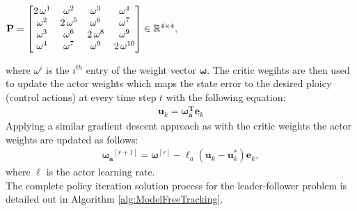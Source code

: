 \documentclass[conference]{IEEEtran}
\begin{document}
 \begin{center}
 ${\bf P}=\begin{bmatrix} 
 2\,\omega^{1}    & \omega^{2}      & \omega^{3}       & \omega^{4}        \\ 
 \omega^{2}       &2\, \omega^{5}   & \omega^{6}       & \omega^{7}        \\
 \omega^{3}       & \omega^{6}      &2\, \omega^{8}   & \omega^{9}   \\   
 \omega^{4}       & \omega^{7}      & \omega^{9}      & 2\,\omega^{10}      
 \end{bmatrix}\in \mathbb{R}^{4\times 4},$
 \end{center}
 where $\omega^{i}$ is the $i^{th}$ entry of the weight vector $\bm{\omega}.$ 
 The critic wegihts are then used to update the actor weights which maps the state error to the desired ploicy (control actions) at every time step $t$ with the following equation:
 \begin{align}
 \label{eq:actorWeightsPolicy}    
 \mathbf{u}_k  =  \mathbf{\omega_a^{T}} \mathbf{e}_k
 \end{align}   
 Applying a similar gradient descent approach as with the critic weights the actor weights are updated as follows:
\begin{align}
   \bm{\omega_a}^{[r+1]} = \bm{\omega}^{[r]} - \ell_a(\mathbf{u}_k-\mathbf{u}_k^*)\mathbf{e}_k, 
 \label{eq:actorWeights}
 \end{align}
 where $\ell$ is the actor learning rate. 
 \\
 The complete policy iteration solution process for the leader-follower problem is detailed out in Algorithm \ref{alg:ModelFreeTracking}. %
\end{document}
